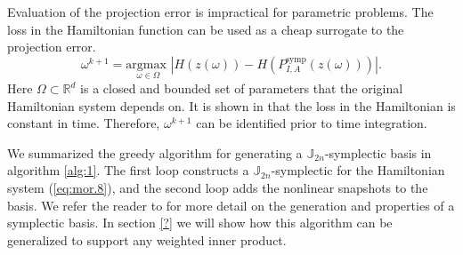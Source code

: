 Evaluation of the projection error is impractical for parametric problems. The loss in the Hamiltonian function can be used as a cheap surrogate to the projection error.
\begin{equation} \label{eq:mor.16}
	\omega^{k+1} = \underset{\omega \in \Omega}{\text{argmax } } | H(z(\omega)) - H(P^\text{symp}_{I,A}(z(\omega))) |.
\end{equation}
Here $\Omega\subset \mathbb R^{d}$ is a closed and bounded set of parameters that the original Hamiltonian system depends on. It is shown in \cite{doi:10.1137/17M1111991} that the loss in the Hamiltonian is constant in time. Therefore, $\omega^{k+1}$ can be identified prior to time integration.

We summarized the greedy algorithm for generating a $\mathbb J_{2n}$-symplectic basis in algorithm \ref{alg:1}. The first loop constructs a $\mathbb J_{2n}$-symplectic for the Hamiltonian system (\ref{eq:mor.8}), and the second loop adds the nonlinear snapshots to the basis. We refer the reader to \cite{doi:10.1137/17M1111991} for more detail on the generation and properties of a symplectic basis. In section \ref{?} we will show how this algorithm can be generalized to support any weighted inner product.

